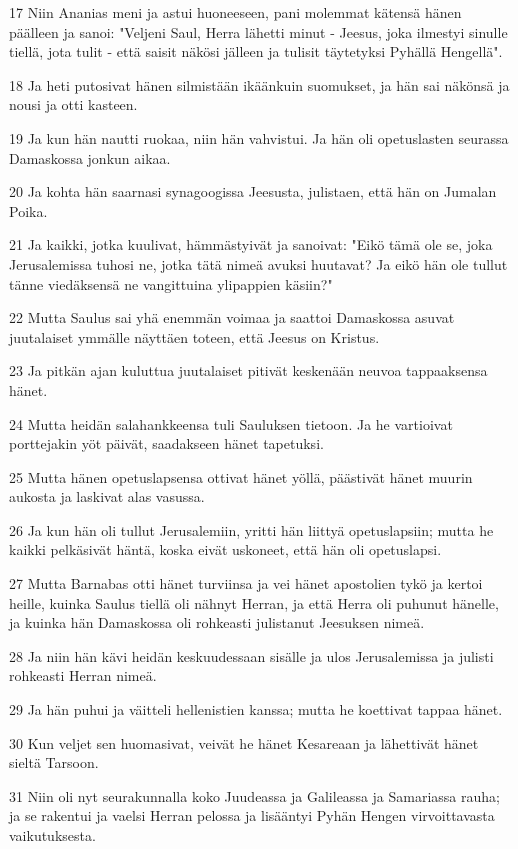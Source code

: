 \par 17 Niin Ananias meni ja astui huoneeseen, pani molemmat kätensä hänen päälleen ja sanoi: "Veljeni Saul, Herra lähetti minut - Jeesus, joka ilmestyi sinulle tiellä, jota tulit - että saisit näkösi jälleen ja tulisit täytetyksi Pyhällä Hengellä".
\par 18 Ja heti putosivat hänen silmistään ikäänkuin suomukset, ja hän sai näkönsä ja nousi ja otti kasteen.
\par 19 Ja kun hän nautti ruokaa, niin hän vahvistui. Ja hän oli opetuslasten seurassa Damaskossa jonkun aikaa.
\par 20 Ja kohta hän saarnasi synagoogissa Jeesusta, julistaen, että hän on Jumalan Poika.
\par 21 Ja kaikki, jotka kuulivat, hämmästyivät ja sanoivat: "Eikö tämä ole se, joka Jerusalemissa tuhosi ne, jotka tätä nimeä avuksi huutavat? Ja eikö hän ole tullut tänne viedäksensä ne vangittuina ylipappien käsiin?"
\par 22 Mutta Saulus sai yhä enemmän voimaa ja saattoi Damaskossa asuvat juutalaiset ymmälle näyttäen toteen, että Jeesus on Kristus.
\par 23 Ja pitkän ajan kuluttua juutalaiset pitivät keskenään neuvoa tappaaksensa hänet.
\par 24 Mutta heidän salahankkeensa tuli Sauluksen tietoon. Ja he vartioivat porttejakin yöt päivät, saadakseen hänet tapetuksi.
\par 25 Mutta hänen opetuslapsensa ottivat hänet yöllä, päästivät hänet muurin aukosta ja laskivat alas vasussa.
\par 26 Ja kun hän oli tullut Jerusalemiin, yritti hän liittyä opetuslapsiin; mutta he kaikki pelkäsivät häntä, koska eivät uskoneet, että hän oli opetuslapsi.
\par 27 Mutta Barnabas otti hänet turviinsa ja vei hänet apostolien tykö ja kertoi heille, kuinka Saulus tiellä oli nähnyt Herran, ja että Herra oli puhunut hänelle, ja kuinka hän Damaskossa oli rohkeasti julistanut Jeesuksen nimeä.
\par 28 Ja niin hän kävi heidän keskuudessaan sisälle ja ulos Jerusalemissa ja julisti rohkeasti Herran nimeä.
\par 29 Ja hän puhui ja väitteli hellenistien kanssa; mutta he koettivat tappaa hänet.
\par 30 Kun veljet sen huomasivat, veivät he hänet Kesareaan ja lähettivät hänet sieltä Tarsoon.
\par 31 Niin oli nyt seurakunnalla koko Juudeassa ja Galileassa ja Samariassa rauha; ja se rakentui ja vaelsi Herran pelossa ja lisääntyi Pyhän Hengen virvoittavasta vaikutuksesta.
